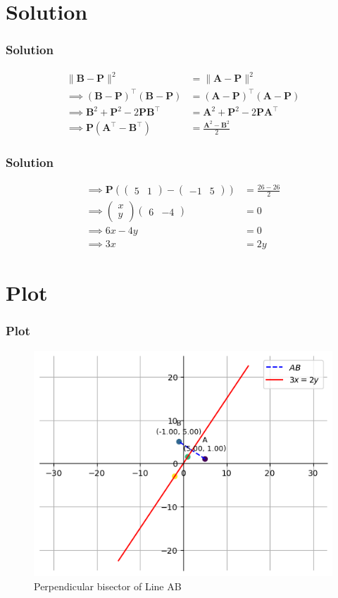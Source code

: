 \documentclass{beamer}
\providecommand{\brak}[1]{\ensuremath{\left(#1\right)}}
\theoremstyle{remark}
\providecommand{\norm}[1]{\lVert#1\rVert}
\newcommand{\myvec}[1]{\ensuremath{\begin{pmatrix}#1\end{pmatrix}}}
\let\vec\mathbf
\numberwithin{equation}{section}
\begin{document}
\section{Solution}
\begin{frame}
\frametitle{Solution}
\begin{align}
	\norm{ \vec B-\vec P }^2 &= \norm{ \vec A -\vec P }^2 \\
	\implies \brak{\vec B-\vec P}^\top\brak{\vec B-\vec P}&= \brak{\vec A-\vec P}^\top\brak{\vec A-\vec P}\\
    \implies \vec B^{2} + \vec P^{2} - 2 \vec P\vec B^\top &= \vec A^2 + \vec P^2 - 2\vec P\vec A^\top \\
    \implies \vec P\brak{\vec A^\top - \vec B^\top} &= \frac{\vec A^2 - \vec B^2}{2}
\end{align}
\end{frame}
\begin{frame}
\frametitle{Solution}
\begin{align}
 \implies \vec P\brak{\myvec{5 & 1} - \myvec{-1 & 5}} &= \frac{26 - 26}{2} \\
    \implies \myvec{x\\y}\myvec{6 & -4} &= 0\\
    \implies 6x-4y &= 0\\
    \implies 3x &= 2y
\end{align}
\end{frame}
\section{Plot}
\begin{frame}
\frametitle{Plot}
\begin{figure}[H]
    \centering
	\includegraphics[width=1\textwidth]{plots/plot.png}
    \caption{Perpendicular bisector of Line AB}
    \end{figure}   
%
\end{frame}
\end{document}
